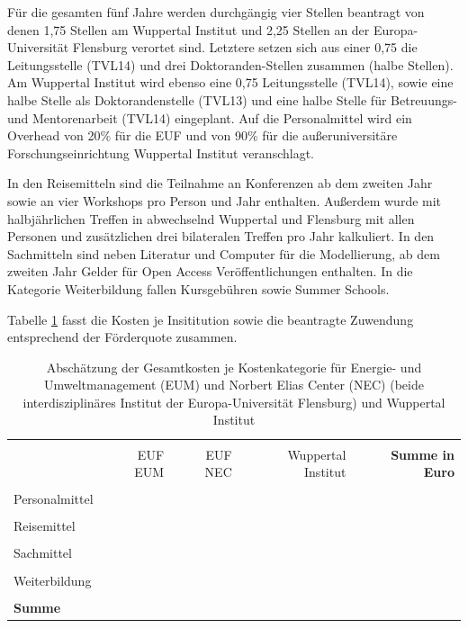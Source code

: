 \documentclass[a4paper,11pt,twoside]{scrartcl}
\begin{document}
Für die gesamten fünf Jahre werden durchgängig vier Stellen beantragt von denen 1,75 Stellen am Wuppertal Institut und 2,25 Stellen an der Europa-Universität Flensburg verortet sind. Letztere setzen sich aus einer 0,75 die Leitungsstelle (TVL14) und drei Doktoranden-Stellen zusammen (halbe Stellen). Am Wuppertal Institut wird ebenso eine 0,75 Leitungsstelle (TVL14), sowie eine halbe Stelle als Doktorandenstelle (TVL13) und eine halbe Stelle für Betreuungs- und Mentorenarbeit (TVL14) eingeplant. Auf die Personalmittel wird ein Overhead von 20\% für die EUF und von 90\% für die außeruniversitäre Forschungseinrichtung Wuppertal Institut veranschlagt.

In den Reisemitteln sind die Teilnahme an Konferenzen ab dem zweiten Jahr sowie an vier Workshops pro Person und Jahr enthalten. Außerdem wurde mit halbjährlichen Treffen in abwechselnd Wuppertal und Flensburg mit allen Personen und zusätzlichen drei bilateralen Treffen pro Jahr kalkuliert. In den Sachmitteln sind neben Literatur und Computer für die Modellierung, ab dem zweiten Jahr Gelder für Open Access Veröffentlichungen enthalten. In die Kategorie Weiterbildung fallen Kursgebühren sowie Summer Schools.

Tabelle \ref{tab:kostenkalkulation} fasst die Kosten je Insititution sowie die beantragte Zuwendung entsprechend der Förderquote zusammen.

\begin{table}[h]
\begin{center}
  \caption{Abschätzung der Gesamtkosten je Kostenkategorie für Energie- und Umweltmanagement (EUM) und Norbert Elias Center (NEC) (beide interdisziplinäres Institut der Europa-Universität Flensburg) und Wuppertal Institut}
  
\begin{tabular}[h]{|l | r | r | r | r|}
\hline
&&&&\\
& EUF EUM & EUF NEC & Wuppertal Institut & \textbf{Summe in Euro}\\
\hline
\hline
&&&&\\
 Personalmittel & & & & \\
 \hline
 &&&&\\
 Reisemittel & & & & \\
 \hline
 &&&&\\
 Sachmittel & & & & \\
 \hline
 &&&&\\
 Weiterbildung & & & &\\
 \hline
 \hline
 &&&&\\
 \textbf{Summe}&& \textbf{}&\textbf{}&\underline{\textbf{}}\\
 \hline
 \end{tabular}
 \label{tab:kostenkalkulation}
\end{center}
\end{table}
\end{document}
